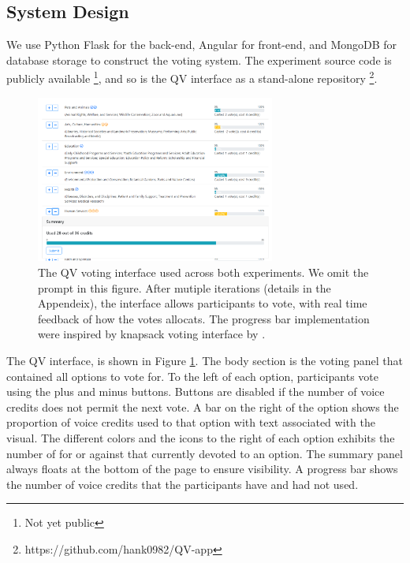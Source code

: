 \subsection{System Design}
We use Python Flask for the back-end, Angular for front-end, 
and MongoDB for database storage to construct the voting system. 
The experiment source code is publicly available \footnote{Not yet public}, 
and so is the QV interface as a stand-alone repository \footnote{https://github.com/hank0982/QV-app}.

\begin{figure}[htpb]
    \centering
    \includegraphics[width=0.7\textwidth, keepaspectratio=true]{content/image/qv-donation.png}
    \caption{
        The QV voting interface used across both experiments. 
        We omit the prompt in this figure.
        After mutiple iterations (details in the Appendeix), 
        the interface allows participants to vote, 
        with real time feedback of how the votes allocats. 
        The progress bar implementation 
        were inspired by knapsack voting interface by \textcite{goel2015knapsack}.
    }
    \label{fig:qv_donation}
\end{figure}

The QV interface, is shown in Figure \ref{fig:qv_donation}.
The body section is the voting panel
that contained all options to vote for.
To the left of each option, 
participants vote using the plus and minus buttons.
Buttons are disabled 
if the number of voice credits 
does not permit the next vote.
A bar on the right of the option 
shows the proportion of voice credits 
used to that option with text associated with the visual.
The different colors and the icons 
to the right of each option 
exhibits the number of for or against 
that currently devoted to an option.
The summary panel always 
floats at the bottom of the page 
to ensure visibility.
A progress bar shows the number of voice credits 
that the participants have and had not used.\par